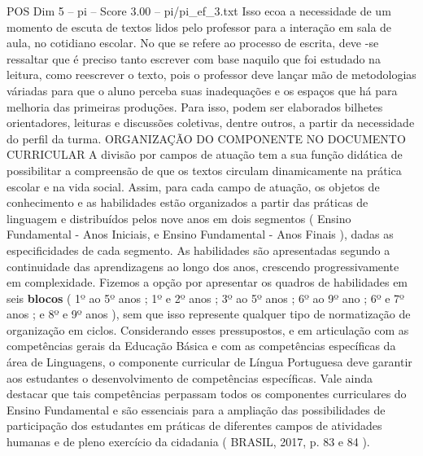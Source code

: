 \begin{textsample}{POS Dim 5 – pi – Score 3.00 – pi/pi\_ef\_3.txt}
Isso ecoa a necessidade de um momento de escuta de textos lidos pelo professor para a interação em sala de aula, no cotidiano escolar.
No que se refere ao processo de escrita, deve -se ressaltar que é preciso tanto escrever com base naquilo que foi estudado na leitura, como reescrever o texto, pois o professor deve lançar mão de metodologias váriadas para que o aluno perceba suas inadequações e os espaços que há para melhoria das primeiras produções.
Para isso, podem ser elaborados bilhetes orientadores, leituras e discussões coletivas, dentre outros, a partir da necessidade do perfil da turma.
ORGANIZAÇÃO DO COMPONENTE NO DOCUMENTO CURRICULAR A divisão por campos de atuação tem a sua função didática de possibilitar a compreensão de que os textos circulam dinamicamente na prática escolar e na vida social.
Assim, para cada campo de atuação, os objetos de conhecimento e as habilidades estão organizados a partir das práticas de linguagem e distribuídos pelos nove anos em dois segmentos ( Ensino Fundamental - Anos Iniciais, e Ensino Fundamental - Anos Finais ), dadas as especificidades de cada segmento.
As habilidades são apresentadas segundo a continuidade das aprendizagens ao longo dos anos, crescendo progressivamente em complexidade.
Fizemos a opção por apresentar os quadros de habilidades em seis \textbf{blocos} ( 1º ao 5º anos ; 1º e 2º anos ; 3º ao 5º anos ; 6º ao 9º ano ; 6º e 7º anos ; e 8º e 9º anos ), sem que isso represente qualquer tipo de normatização de organização em ciclos.
Considerando esses pressupostos, e em articulação com as competências gerais da Educação Básica e com as competências específicas da área de Linguagens, o componente curricular de Língua Portuguesa deve garantir aos estudantes o desenvolvimento de competências específicas.
Vale ainda destacar que tais competências perpassam todos os componentes curriculares do Ensino Fundamental e são essenciais para a ampliação das possibilidades de participação dos estudantes em práticas de diferentes campos de atividades humanas e de pleno exercício da cidadania ( BRASIL, 2017, p. 83 e 84 ).

\end{textsample}
